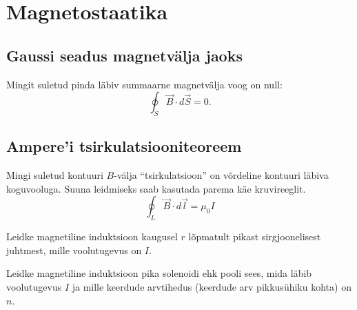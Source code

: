 \documentclass[a4paper,11pt,twocolumn]{article}
\begin{document}



\section{Magnetostaatika}
\subsection{Gaussi seadus magnetvälja jaoks}
Mingit suletud pinda läbiv summaarne magnetvälja voog on null:
\begin{equation*}
    \oint_S\vec{B}\cdot d\vec{S}=0 \tag{II Maxwelli võrrand}.
\end{equation*}

\subsection{Ampere'i tsirkulatsiooniteoreem}

Mingi suletud kontuuri $B$-välja \enquote{tsirkulatsioon} on võrdeline kontuuri läbiva koguvooluga. Suuna leidmiseks saab kasutada parema käe kruvireeglit.
\begin{equation*}
    \oint_L\vec{B}\cdot d\vec{l}=\mu_0 I \tag{III Maxwelli võrrand}
\end{equation*}
\begin{question}
    Leidke magnetiline induktsioon kaugusel $r$ lõpmatult pikast sirgjoonelisest juhtmest, mille voolutugevus on $I$.
\end{question}

\begin{question}
    Leidke magnetiline induktsioon pika solenoidi ehk pooli sees, mida läbib voolutugevus $I$ ja mille keerdude arvtihedus (keerdude arv pikkusühiku kohta) on $n$.
\end{question}
\end{document}
